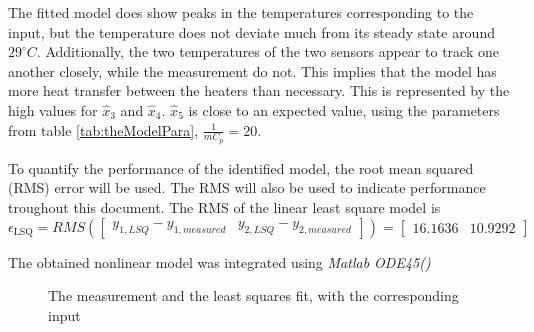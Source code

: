 The fitted model does show peaks in the temperatures corresponding to the input, but the temperature does not deviate much from its steady state around $29^{\circ}C$. Additionally, the two temperatures of the two sensors appear to track one another closely, while the measurement do not. This implies that the model has more heat transfer between the heaters than necessary. This is represented by the high values for $\hat{x}_3$ and $\hat{x}_4$. $\hat{x}_5$ is close to an expected value, using the parameters from table \ref{tab:theModelPara}, $\frac{1}{mC_p} = 20$.

To quantify the performance of the identified model, the root mean squared (RMS) error will be used. The RMS will also be used to indicate performance troughout this document. The RMS of the linear least square model is
$$
\epsilon_{\text{LSQ}} = RMS(\begin{bmatrix} y_{1,LSQ} - y_{1,measured} & y_{2,LSQ} - y_{2,measured} \end{bmatrix}) = \begin{bmatrix} 16.1636 & 10.9292 \end{bmatrix}
$$

The obtained nonlinear model was integrated using \textit{Matlab ODE45()} 
\begin{figure}
    \centering
    
    \caption{The measurement and the least squares fit, with the corresponding input}
    \label{fig:lsqfit}
\end{figure}